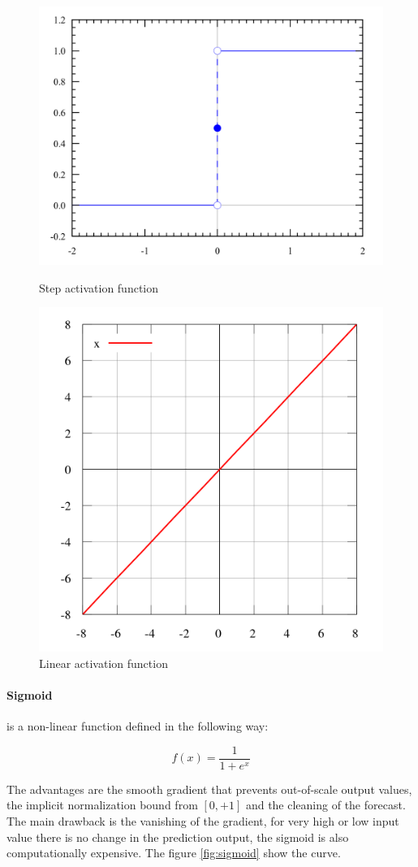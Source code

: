 \documentclass[%
    corpo=12pt,
    twoside,
    oldstyle,
    autoretitolo,
    greek,
    evenboxes,
]{toptesi}
\begin{document}
\begin{figure}
  \centering
  \begin{minipage}{.5\textwidth}
    \centering
    \includegraphics[width=0.85\linewidth]{figure/step.png}
    \caption{Step activation function}
    \label{fig:step}
  \end{minipage}%
  \begin{minipage}{.5\textwidth}
    \centering
    \includegraphics[width=0.75\linewidth]{figure/linear.png}
    \caption{Linear activation function}
    \label{fig:linear}
  \end{minipage}
\end{figure}

\paragraph{Sigmoid}
is a non-linear function defined in the following way:
\begin{center}
  \begin{equation}
    f(x) = \frac{1}{1+e^{x}}
  \end{equation}
\end{center}
The advantages are the smooth gradient that prevents out-of-scale output values, the implicit normalization bound from $[0, +1]$ and the cleaning of the forecast. The main drawback is the vanishing of the gradient, for very high or low input value there is no change in the prediction output, the sigmoid is also computationally expensive. The figure \ref{fig:sigmoid} show the curve.
\end{document}
